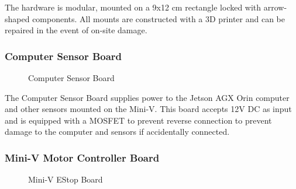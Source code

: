 \documentclass[lettersize,journal]{IEEEtran}
\begin{document}
The hardware is modular, mounted on a 9x12 cm rectangle locked with arrow-shaped components.
All mounts are constructed with a 3D printer and can be repaired in the event of on-site damage.

\subsubsection{Computer Sensor Board}

\begin{figure}[H]
  \begin{center}
  \end{center}
  \caption{Computer Sensor Board}
  \label{fig:miniv_computer_sensor_board}
\end{figure}

The Computer Sensor Board supplies power to the Jetson AGX Orin computer and other sensors mounted on the Mini-V.
This board accepts 12V DC as input and is equipped with a MOSFET to prevent reverse connection to prevent damage to the computer and sensors if accidentally connected.

\subsubsection{Mini-V Motor Controller Board}

\begin{figure}[H]
  \begin{center}
  \end{center}
  \caption{Mini-V EStop Board}
  \label{fig:miniv_motor_controller_board}
\end{figure}
\end{document}
